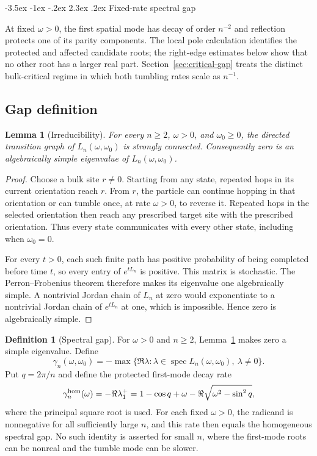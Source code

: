 \documentclass[twoside,10pt]{article}
\makeatletter
\numberwithin{equation}{section}
\theoremstyle{slbody}
\newtheorem{lemma}[theorem]{Lemma}
\theoremstyle{definition}
\newtheorem{definition}[theorem]{Definition}
\theoremstyle{remark}
\newcommand{\spec}{\operatorname{spec}}
\renewcommand{\section}{%
  \@startsection{section}{1}{\z@}%
    {-3.5ex \@plus -1ex \@minus -.2ex}%
    {2.3ex \@plus .2ex}%
    {\normalfont\large\bfseries}}
\makeatother
\begin{document}
\section{Fixed-rate spectral gap}\label{sec:fixed-gap}

At fixed $\omega>0$, the first spatial mode has decay of order $n^{-2}$
and reflection protects one of its parity components.  The local pole
calculation identifies the protected and affected candidate roots; the
right-edge estimates below show that no other root has a larger real
part.  Section~\ref{sec:critical-gap} treats the distinct bulk-critical
regime in which both tumbling rates scale as $n^{-1}$.

\subsection{Gap definition}

\begin{lemma}[Irreducibility]\label{lem:irreducibility}
For every $n\ge2$, $\omega>0$, and $\omega_0\ge0$, the directed transition
graph of $L_n(\omega,\omega_0)$ is strongly connected.  Consequently zero
is an algebraically simple eigenvalue of $L_n(\omega,\omega_0)$.
\end{lemma}

\begin{proof}
Choose a bulk site $r\ne0$.  Starting from any state, repeated hops in its
current orientation reach $r$.  From $r$, the particle can continue hopping
in that orientation or can tumble once, at rate $\omega>0$, to reverse it.
Repeated hops in
the selected orientation then reach any prescribed target site with the
prescribed orientation.  Thus every state communicates with every other
state, including when $\omega_0=0$.

For every $t>0$, each such finite path has positive probability of being
completed before time $t$, so every entry of $e^{tL_n}$ is positive.  This
matrix is stochastic.  The Perron--Frobenius theorem therefore makes its
eigenvalue one algebraically simple.  A nontrivial Jordan chain of $L_n$ at
zero would exponentiate to a nontrivial Jordan chain of $e^{tL_n}$ at one,
which is impossible.  Hence zero is algebraically simple.
\end{proof}

\begin{definition}[Spectral gap]\label{def:gap}
For $\omega>0$ and $n\ge2$, Lemma~\ref{lem:irreducibility} makes zero a
simple eigenvalue.  Define
\[
 \gamma_n(\omega,\omega_0)
 =-\max\{\Re\lambda:\lambda\in\spec L_n(\omega,\omega_0),
                            \ \lambda\ne0\}.
\]
Put $q=2\pi/n$ and define the protected first-mode decay rate
\begin{equation}\label{eq:hom-gap}
 \gamma_n^{\rm hom}(\omega)
 =-\Re\lambda_1^+
 =1-\cos q+\omega-\Re\sqrt{\omega^2-\sin^2q},
\end{equation}
where the principal square root is used.  For each fixed $\omega>0$,
the radicand is nonnegative for all sufficiently large $n$, and this
rate then equals the homogeneous spectral gap.  No such identity is
asserted for small $n$, where the first-mode roots can be nonreal and
the tumble mode can be slower.
\end{definition}
\end{document}
